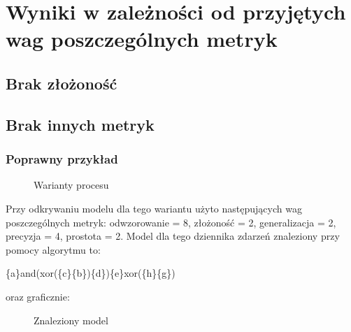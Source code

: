 \section{Wyniki w zależności od przyjętych wag poszczególnych metryk}

\subsection{Brak złożoność}

\subsection{Brak innych metryk}

\subsubsection{Poprawny przykład}
\begin{figure}[!ht]
	\caption{\label{fig:flow_chart}Warianty procesu}
\end{figure}

Przy odkrywaniu modelu dla tego wariantu użyto następujących wag poszczególnych metryk: odwzorowanie = 8, złożoność = 2, generalizacja = 2, precyzja = 4, prostota = 2. Model dla tego dziennika zdarzeń znaleziony przy pomocy algorytmu to:
\begin{center}
	\{a\}and(xor(\{c\}\{b\})\{d\})\{e\}xor(\{h\}\{g\})
\end{center}
oraz graficznie:

\begin{figure}[!ht]
	\caption{\label{fig:flow_chart}Znaleziony model}
\end{figure}

